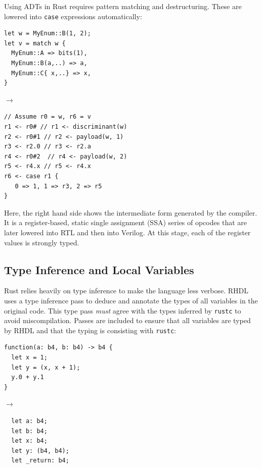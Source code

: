 \documentclass[sigplan,screen,sigconf]{acmart}
\begin{document}
Using ADTs in Rust requires pattern matching and destructuring.  These are lowered into \verb|case| expressions automatically:
\begin{center}
\begin{minipage}{3.1cm}
\begin{verbatim}
let w = MyEnum::B(1, 2);
let v = match w {
  MyEnum::A => bits(1),
  MyEnum::B(a,..) => a,
  MyEnum::C{ x,..} => x,
}
\end{verbatim}
\end{minipage}
$\rightarrow$
\begin{minipage}{4.1cm}
\begin{verbatim}
// Assume r0 = w, r6 = v
r1 <- r0# // r1 <- discriminant(w)
r2 <- r0#1 // r2 <- payload(w, 1)
r3 <- r2.0 // r3 <- r2.a
r4 <- r0#2  // r4 <- payload(w, 2)
r5 <- r4.x // r5 <- r4.x
r6 <- case r1 {
   0 => 1, 1 => r3, 2 => r5
}
\end{verbatim}
\end{minipage}
\end{center}
Here, the right hand side shows the intermediate form generated by the compiler.  It is a register-based, static single assignment (SSA) series of opcodes that are later lowered into RTL and then into Verilog.  At this stage, each of the register values is strongly typed.

\subsection{Type Inference and Local Variables}
Rust relies heavily on type inference to make the language less verbose.  RHDL uses a type inference pass to deduce and annotate the types of all variables in the original code.  This type pass \emph{must} agree with the types inferred by \verb|rustc| to avoid miscompilation.  Passes are included to ensure that all variables are typed by RHDL and that the typing is consisting with \verb|rustc|:
\begin{center}
\begin{minipage}{4cm}
\begin{verbatim}
function(a: b4, b: b4) -> b4 {
  let x = 1;
  let y = (x, x + 1);
  y.0 + y.1
}
\end{verbatim}
\end{minipage}
$\rightarrow$
\begin{minipage}{3cm}
\begin{verbatim}
  let a: b4;
  let b: b4;
  let x: b4;
  let y: (b4, b4);
  let _return: b4;
\end{verbatim}
\end{minipage}
\end{center}
\end{document}
